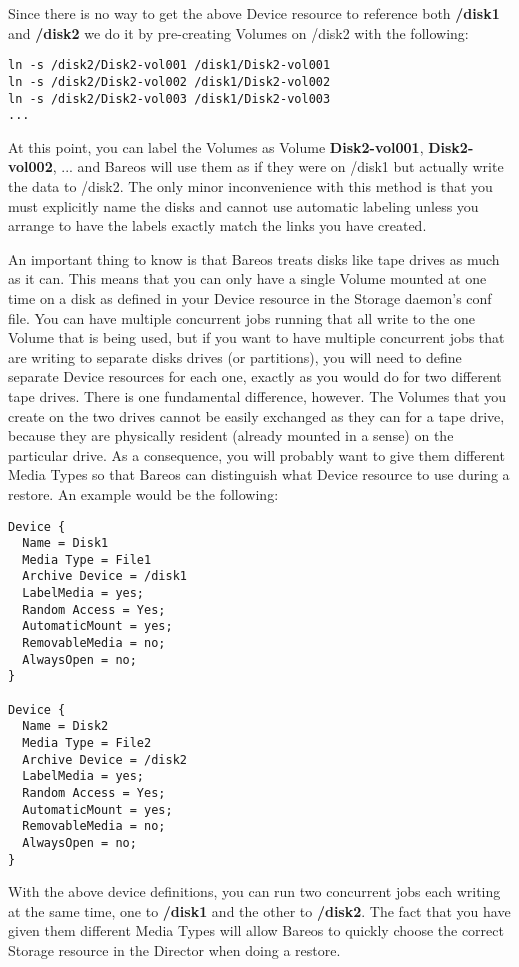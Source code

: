 Since there is no way to get the above Device resource to reference both {\bf
/disk1} and {\bf /disk2} we do it by pre-creating Volumes on /disk2 with the
following:

\footnotesize
\begin{verbatim}
ln -s /disk2/Disk2-vol001 /disk1/Disk2-vol001
ln -s /disk2/Disk2-vol002 /disk1/Disk2-vol002
ln -s /disk2/Disk2-vol003 /disk1/Disk2-vol003
...
\end{verbatim}
\normalsize

At this point, you can label the Volumes as Volume {\bf Disk2-vol001}, {\bf
Disk2-vol002}, ... and Bareos will use them as if they were on /disk1 but
actually write the data to /disk2. The only minor inconvenience with this
method is that you must explicitly name the disks and cannot use automatic
labeling unless you arrange to have the labels exactly match the links you
have created.

An important thing to know is that Bareos treats disks like tape drives
as much as it can. This means that you can only have a single Volume
mounted at one time on a disk as defined in your Device resource in
the Storage daemon's conf file.  You can have multiple concurrent
jobs running that all write to the one Volume that is being used, but
if you want to have multiple concurrent jobs that are writing to
separate disks drives (or partitions), you will need to define
separate Device resources for each one, exactly as you would do for
two different tape drives.  There is one fundamental difference, however.
The Volumes that you create on the two drives cannot be easily exchanged
as they can for a tape drive, because they are physically resident (already
mounted in a sense) on the particular drive.  As a consequence, you will
probably want to give them different Media Types so that Bareos can
distinguish what Device resource to use during a restore.
An example would be the following:

\footnotesize
\begin{verbatim}
Device {
  Name = Disk1
  Media Type = File1
  Archive Device = /disk1
  LabelMedia = yes;
  Random Access = Yes;
  AutomaticMount = yes;
  RemovableMedia = no;
  AlwaysOpen = no;
}

Device {
  Name = Disk2
  Media Type = File2
  Archive Device = /disk2
  LabelMedia = yes;
  Random Access = Yes;
  AutomaticMount = yes;
  RemovableMedia = no;
  AlwaysOpen = no;
}
\end{verbatim}
\normalsize

With the above device definitions, you can run two concurrent
jobs each writing at the same time, one to {\bf /disk1} and the
other to {\bf /disk2}.  The fact that you have given them different
Media Types will allow Bareos to quickly choose the correct
Storage resource in the Director when doing a restore.

